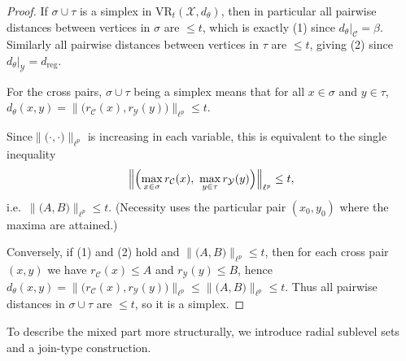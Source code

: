 \documentclass[11pt]{amsart}
\theoremstyle{definition}
\theoremstyle{remark}
\newcommand{\1}{\mathbbm{1}}
\begin{document}
\begin{proof}
If $\sigma\cup\tau$ is a simplex in $\mathrm{VR}_t(\mathcal X,d_\theta)$, then in particular all pairwise distances
between vertices in $\sigma$ are $\le t$, which is exactly (1) since $d_\theta|_{\mathcal C}=\beta$.
Similarly all pairwise distances between vertices in $\tau$ are $\le t$, giving (2) since $d_\theta|_{\mathcal Y}=d_{\mathrm{reg}}$.

For the cross pairs, $\sigma\cup\tau$ being a simplex means that for all $x\in\sigma$ and $y\in\tau$, $d_\theta(x,y)=\bigl\|\bigl(r_{\mathcal C}(x), r_{\mathcal Y}(y)\bigr)\bigr\|_{\ell^p}\le t.$

Since$ \bigl\|\bigl(\cdot, \cdot\bigr)\bigr\|_{\ell^p}$ is increasing in each variable, this is equivalent to the single inequality
\[ \Bigl\|\Bigl(\max_{x\in\sigma}r_{\mathcal C}(x),\ \max_{y\in\tau} r_{\mathcal Y}(y)\Bigr)\Bigr\|_{\ell^p}
\le t,
\]
i.e.\  $\bigl\|\bigl(A, B\bigr)\bigr\|_{\ell^p}\le t$. (Necessity uses the particular pair $(x_0,y_0)$ where the maxima are attained.)

Conversely, if (1) and (2) hold and $\bigl\|\bigl(A, B\bigr)\bigr\|_{\ell^p}\le t$, then for each cross pair $(x,y)$ we have
$r_{\mathcal C}(x)\le A$ and $r_{\mathcal Y}(y)\le B$, hence
$d_\theta(x,y)= \bigl\|\bigl(r_{\mathcal C}(x),r_{\mathcal Y}(y)\bigr)\bigr\|_{\ell^p}
\le \bigl\|\bigl(A, B\bigr)\bigr\|_{\ell^p}
\le t.$
Thus all pairwise distances in $\sigma\cup\tau$ are $\le t$, so it is a simplex.
\end{proof}

To describe the mixed part more structurally, we introduce radial sublevel sets and a join-type construction.
\end{document}
